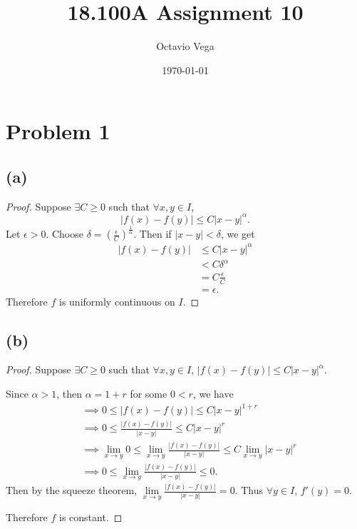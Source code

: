 \documentclass{article}
\title{18.100A Assignment 10}
\author{Octavio Vega}
\date\today
\begin{document}
\maketitle
	
\section*{Problem 1}
\subsection*{(a)}
\begin{proof}
	Suppose $\exists C \geq 0$ such that $\forall x, y \in I$,
	\begin{equation}
		|f(x) - f(y)| \leq C |x - y|^\alpha.
	\end{equation}
	Let $\epsilon > 0$. Choose $\delta = \left(\frac{\epsilon}{C}\right)^\frac{1}{\alpha}$. Then if $|x - y| < \delta$, we get
	\begin{align}
		|f(x) - f(y)| & \leq C |x - y|^\alpha \\
		& < C \delta^\alpha \\
		&= C \frac{\epsilon}{C} \\
		&= \epsilon.
	\end{align}
	Therefore $f$ is uniformly continuous on $I$.
\end{proof}

\subsection*{(b)}
\begin{proof}
	Suppose $\exists C \geq 0$ such that $\forall x, y \in I$, $|f(x) - f(y)| \leq C |x - y|^\alpha$.
	
	Since $\alpha > 1$, then $\alpha = 1 + r$ for some $0 < r$, we have
	\begin{align}
		& \implies 0 \leq |f(x) - f(y)| \leq C |x - y|^{1 + r} \\
		& \implies 0 \leq \frac{|f(x) - f(y)|}{|x - y|} \leq C |x - y|^r \\
		& \implies \lim\limits_{x \to y} 0 \leq \lim\limits_{x \to y} \frac{|f(x) - f(y)|}{|x - y|} \leq C \lim\limits_{x \to y}|x - y|^r \\
		& \implies 0 \leq \lim\limits_{x \to y} \frac{|f(x) - f(y)|}{|x - y|} \leq 0.
	\end{align} 
	Then by the squeeze theorem, $\lim \limits_{x \to y} \frac{|f(x) - f(y)|}{|x - y|} = 0$. Thus $\forall y \in I$, $f'(y) = 0$.
	
	Therefore $f$ is constant. 
\end{proof}
\end{document}
